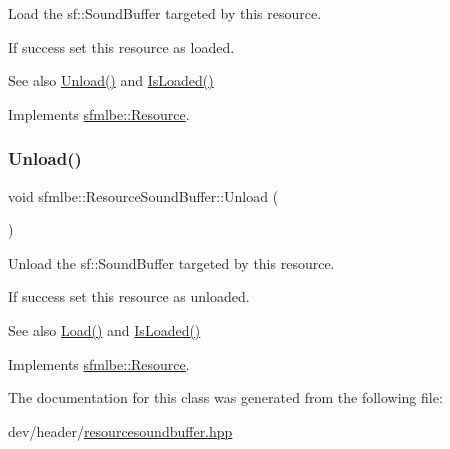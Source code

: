 Load the sf\+::\+Sound\+Buffer targeted by this resource. 

If success set this resource as loaded. \begin{DoxySeeAlso}{See also}
\mbox{\hyperlink{classsfmlbe_1_1_resource_sound_buffer_aea7707b97d4451935597671c0e162a7b}{Unload()}} and \mbox{\hyperlink{classsfmlbe_1_1_resource_acd0812c81f7d5d851a4671f0cf7bb4f1}{Is\+Loaded()}} 
\end{DoxySeeAlso}


Implements \mbox{\hyperlink{classsfmlbe_1_1_resource_a35981869a1e90ebbf30258ff7aa1d6d2}{sfmlbe\+::\+Resource}}.

\mbox{\label{classsfmlbe_1_1_resource_sound_buffer_aea7707b97d4451935597671c0e162a7b}} 
\subsubsection{\texorpdfstring{Unload()}{Unload()}}
{\footnotesize\ttfamily void sfmlbe\+::\+Resource\+Sound\+Buffer\+::\+Unload (\begin{DoxyParamCaption}{ }\end{DoxyParamCaption})\hspace{0.3cm}{\ttfamily [virtual]}}



Unload the sf\+::\+Sound\+Buffer targeted by this resource. 

If success set this resource as unloaded. \begin{DoxySeeAlso}{See also}
\mbox{\hyperlink{classsfmlbe_1_1_resource_sound_buffer_a1207531bb0e5355f90cf4a7f67734555}{Load()}} and \mbox{\hyperlink{classsfmlbe_1_1_resource_acd0812c81f7d5d851a4671f0cf7bb4f1}{Is\+Loaded()}} 
\end{DoxySeeAlso}


Implements \mbox{\hyperlink{classsfmlbe_1_1_resource_a48c75a88679cf457965dd013f47014b9}{sfmlbe\+::\+Resource}}.



The documentation for this class was generated from the following file\+:\begin{DoxyCompactItemize}
\item 
dev/header/\mbox{\hyperlink{resourcesoundbuffer_8hpp}{resourcesoundbuffer.\+hpp}}\end{DoxyCompactItemize}
